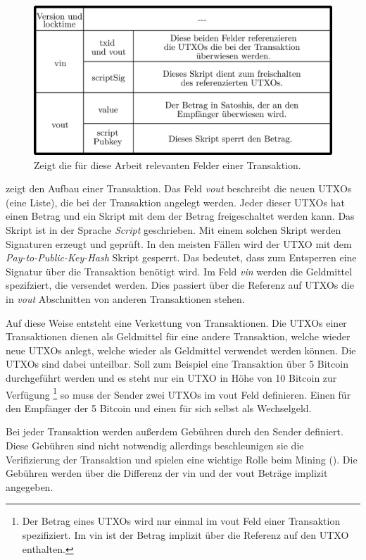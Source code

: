 \documentclass[ngerman,runningheads,a4paper]{llncs}[2018/03/10]
\begin{document}
\begin{figure}
  \centering
  \includegraphics[width=.8\textwidth]{grafiken/tableTransaction.png}
  \caption{Zeigt die für diese Arbeit relevanten Felder einer Transaktion.}
  \label{fig:transactionTable}
\end{figure}

 zeigt den Aufbau einer Transaktion. Das Feld \textit{vout} beschreibt die neuen UTXOs (eine Liste), die bei der Transaktion angelegt werden. Jeder dieser UTXOs hat einen Betrag und ein Skript mit dem der Betrag freigeschaltet werden kann. Das Skript ist in der Sprache \textit{Script} geschrieben. Mit einem solchen Skript werden Signaturen erzeugt und geprüft. In den meisten Fällen wird der UTXO mit dem \textit{Pay-to-Public-Key-Hash} \citep{bitcoinbook} Skript gesperrt. Das bedeutet, dass zum Entsperren eine Signatur über die Transaktion benötigt wird.  Im Feld \textit{vin} werden die Geldmittel spezifziert, die versendet werden. Dies passiert über die Referenz auf UTXOs die in \textit{vout} Abschnitten von anderen Transaktionen stehen.

Auf diese Weise entsteht eine Verkettung von Transaktionen. Die UTXOs einer Transaktionen dienen als Geldmittel für eine andere Transaktion, welche wieder neue UTXOs anlegt, welche wieder als Geldmittel verwendet werden können. Die UTXOs sind dabei unteilbar. Soll zum Beispiel eine Transaktion über 5 Bitcoin durchgeführt werden und es steht nur ein UTXO in Höhe von 10 Bitcoin zur Verfügung \footnote{Der Betrag eines UTXOs wird nur einmal im vout Feld einer Transaktion spezifiziert. Im vin ist der Betrag implizit über die Referenz auf den UTXO enthalten.} so muss der Sender zwei UTXOs im vout Feld definieren. Einen für den Empfänger der 5 Bitcoin und einen für sich selbst als Wechselgeld.

Bei jeder Transaktion werden außerdem Gebühren durch den Sender definiert. Diese Gebühren sind nicht notwendig allerdings beschleunigen sie die Verifizierung der Transaktion und spielen eine wichtige Rolle beim Mining (). Die Gebühren werden über die Differenz der vin und der vout Beträge implizit angegeben.
\end{document}
